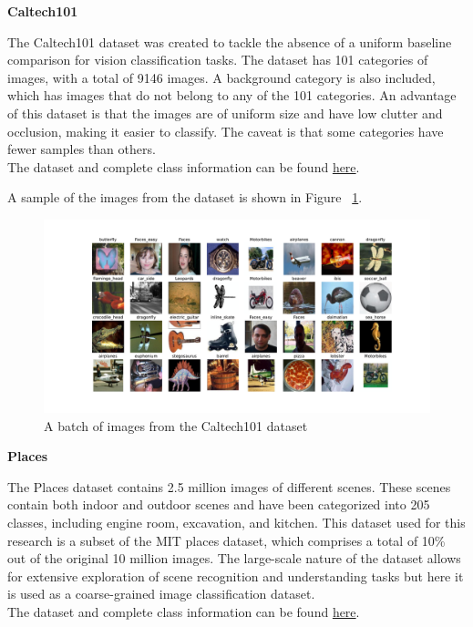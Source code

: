 \documentclass[a4paper,11pt,openright]{book}
\begin{document}
\textbf{Caltech101}

The Caltech101 \cite{liCaltech101} dataset was created to tackle the absence of a uniform baseline comparison for vision classification tasks. The dataset has 101 categories of images, with a total of 9146 images. A background category is also included, which has images that do not belong to any of the 101 categories. An advantage of this dataset is that the images are of uniform size and have low clutter and occlusion, making it easier to classify. The caveat is that some categories have fewer samples than others.\\
The dataset and complete class information can be found \href{https://www.kaggle.com/datasets/862ae86edba271c39f76d0b530edeb55076b4b82b971160637210900747c44b1}{here}.

A sample of the images from the dataset is shown in Figure ~\ref{fig:calt}.

\begin{figure}[!htb]
    \centering
    \includegraphics[width=1\textwidth]{images/caltech101.pdf}
    \caption{A batch of images from the Caltech101 dataset}
    \label{fig:calt}
\end{figure}

\textbf{Places}

The Places dataset \cite{zhouPlaces10Million2018} contains 2.5 million images of different scenes. These scenes contain both indoor and outdoor scenes and have been categorized into 205 classes, including engine room, excavation, and kitchen. This dataset used for this research is a subset of the MIT places dataset, which comprises a total of 10\% out of the original 10 million images. The large-scale nature of the dataset allows for extensive exploration of scene recognition and understanding tasks but here it is used as a coarse-grained image classification dataset.\\
The dataset and complete class information can be found \href{https://www.kaggle.com/datasets/mittalshubham/images256}{here}.
\end{document}
